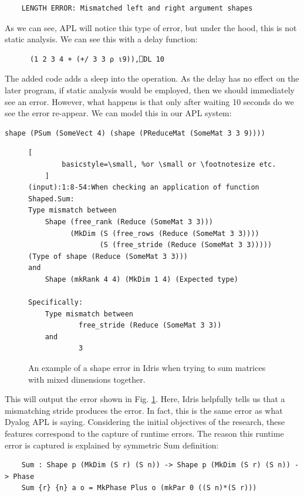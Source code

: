 \documentclass{report}
\begin{document}
\begin{verbatim}
    LENGTH ERROR: Mismatched left and right argument shapes    
\end{verbatim}

As we can see, APL will notice this type of error, but under the hood, this is not static analysis. We can see this with a delay function:

\begin{verbatim}
      (1 2 3 4 + (+/ 3 3 ⍴ ⍳9)),⎕DL 10
\end{verbatim}

The added code adds a sleep into the operation. As the delay has no effect on the later program, if static analysis would be employed, then we should immediately see an error. However, what happens is that only after waiting 10 seconds do we see the error re-appear. We can model this in our APL system:

\begin{verbatim}
shape (PSum (SomeVect 4) (shape (PReduceMat (SomeMat 3 3 9))))
\end{verbatim}

\begin{figure}
    \begin{lstlisting}[
        basicstyle=\small, %or \small or \footnotesize etc.
    ]
(input):1:8-54:When checking an application of function Shaped.Sum:
Type mismatch between
    Shape (free_rank (Reduce (SomeMat 3 3)))
          (MkDim (S (free_rows (Reduce (SomeMat 3 3))))
                 (S (free_stride (Reduce (SomeMat 3 3))))) (Type of shape (Reduce (SomeMat 3 3)))
and
    Shape (mkRank 4 4) (MkDim 1 4) (Expected type)

Specifically:
    Type mismatch between
            free_stride (Reduce (SomeMat 3 3))
    and
            3
    \end{lstlisting}
    \caption{An example of a shape error in Idris when trying to sum matrices with mixed dimensions together.}
    \label{fig:shapeerror}
\end{figure}

This will output the error shown in Fig. \ref{fig:shapeerror}. Here, Idris helpfully tells us that a mismatching stride produces the error. In fact, this is the same error as what Dyalog APL is saying. Considering the initial objectives of the research, these features correspond to the capture of runtime errors. The reason this runtime error is captured is explained by symmetric Sum definition:

\begin{verbatim}
    Sum : Shape p (MkDim (S r) (S n)) -> Shape p (MkDim (S r) (S n)) -> Phase
    Sum {r} {n} a o = MkPhase Plus o (mkPar 0 ((S n)*(S r)))
\end{verbatim}
\end{document}
